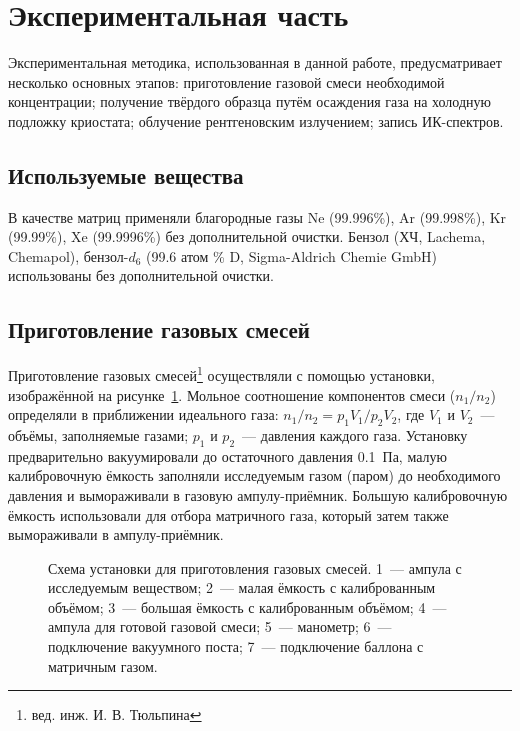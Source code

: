 \newpage
\section{Экспериментальная часть}
Экспериментальная методика, использованная в данной работе, предусматривает несколько основных этапов: 
приготовление газовой смеси необходимой концентрации; получение твёрдого образца путём осаждения газа на холодную подложку криостата; 
облучение рентгеновским излучением; запись ИК-спектров.
\subsection{Используемые вещества}
В качестве матриц применяли благородные газы Ne (99.996\%), Ar (99.998\%), Kr (99.99\%), Xe (99.9996\%) без дополнительной очистки. Бензол (ХЧ, Lachema, Chemapol), бензол-$d_6$ (99.6 атом \% D, Sigma-Aldrich Chemie GmbH) использованы без дополнительной очистки.
\subsection{Приготовление газовых смесей}
Приготовление газовых смесей\footnote{вед. инж. И. В. Тюльпина} осуществляли с помощью установки, 
изображённой на рисунке~\ref{gas}. Мольное соотношение компонентов смеси ($n_1/n_2$) определяли в приближении идеального газа: $n_1/n_2=p_1V_1/p_2V_2$, 
где $V_1$ и $V_2$~--- объёмы, заполняемые газами; $p_1$ и $p_2$~--- давления каждого газа. Установку предварительно вакуумировали до остаточного давления 0.1~Па, 
малую калибровочную ёмкость заполняли исследуемым газом (паром) до необходимого давления и вымораживали в газовую ампулу-приёмник. 
Большую калибровочную ёмкость использовали для отбора матричного газа, который затем также вымораживали в ампулу-приёмник.
\newpage
\begin{figure}[H]
\caption{Схема установки для приготовления газовых смесей. 1~--- ампула с исследуемым веществом; 2~--- малая ёмкость с калиброванным объёмом; 3~--- большая ёмкость с калиброванным объёмом; 4~--- ампула для готовой газовой смеси; 5~--- манометр; 6~--- подключение вакуумного поста; 7~--- подключение баллона с матричным газом.}
\label{gas}
\end{figure}
